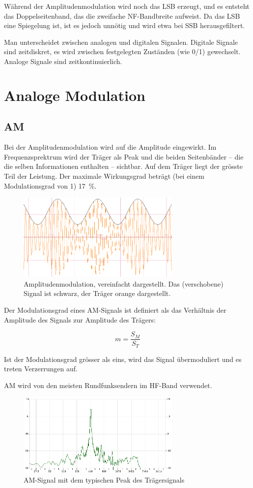 Während der Amplitudenmodulation wird noch das LSB erzeugt, und es entsteht das Doppelseitenband, das die zweifache NF-Bandbreite aufweist. Da das LSB eine Spiegelung ist, ist es jedoch unnötig und wird etwa bei SSB herausgefiltert.

Man unterscheidet zwischen analogen und digitalen Signalen. Digitale Signale sind zeitdiskret, es wird zwischen festgelegten Zuständen (wie 0/1) gewechselt. Analoge Signale sind zeitkontinuierlich. 

\section{Analoge Modulation}

\subsection{AM} \label{sec:am}
Bei der Amplitudenmodulation wird auf die Amplitude eingewirkt. Im Frequenzsprektrum wird der Träger als Peak und die beiden Seitenbänder – die die selben Informationen enthalten – sichtbar. Auf dem Träger liegt der grösste Teil der Leistung. Der maximale Wirkungsgrad beträgt (bei einem Modulationsgrad von 1) 17 \%.

\begin{figure}[h!]
 \centering
 \includegraphics[width=8cm]{./png/Graph_AM.png}
 \caption{Amplitudenmodulation, vereinfacht dargestellt. Das (verschobene) Signal ist schwarz, der Träger orange dargestellt.}
 \label{fig:am}
\end{figure}

Der Modulationsgrad eines AM-Signals ist definiert als das Verhältnis der Amplitude des Signals zur Amplitude des Trägers:

\[
 m = \frac{S_M}{S_T}
\]


Ist der Modulationsgrad grösser als eins, wird das Signal übermoduliert und es treten Verzerrungen auf. 

AM wird von den meisten Rundfunksendern im HF-Band verwendet.

\begin{figure}[h!]
 \centering
 \includegraphics[width=8cm]{./png/AM-Analysis.png}
 \caption{AM-Signal mit dem typischen Peak des Trägersignals}
 \label{fig:amAnalysis}
\end{figure}


